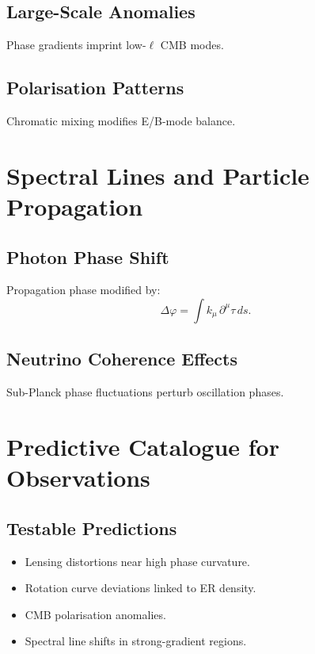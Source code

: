\section{Large-Scale Anomalies}
Phase gradients imprint low-\(\ell\) CMB modes.

\section{Polarisation Patterns}
Chromatic mixing modifies E/B-mode balance.

\chapter{Spectral Lines and Particle Propagation}

\section{Photon Phase Shift}
Propagation phase modified by:
\[
\Delta\varphi=\int k_\mu\,\partial^\mu\tau\,ds.
\]

\section{Neutrino Coherence Effects}
Sub-Planck phase fluctuations perturb oscillation phases.

\chapter{Predictive Catalogue for Observations}

\section{Testable Predictions}
\begin{itemize}
\item Lensing distortions near high phase curvature.
\item Rotation curve deviations linked to ER density.
\item CMB polarisation anomalies.
\item Spectral line shifts in strong-gradient regions.
\end{itemize}
